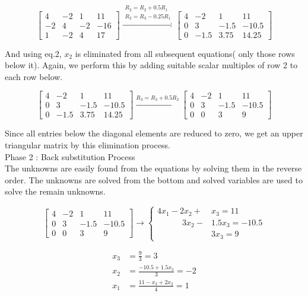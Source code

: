	\[ \begin{bmatrix} 4 & -2 & 1 & 11 \\ -2 & 4 & -2 & -16 \\ 1 & -2 & 4 & 17 \end{bmatrix} \xrightarrow{\substack{R_2 = R_2 + 0.5R_1\\ R_3 = R_3 - 0.25R_1}} \begin{bmatrix} 4 & -2 & 1 & 11 \\ 0 & 3 & -1.5 & -10.5 \\ 0 & -1.5 & 3.75 & 14.25 \end{bmatrix}\]

	And using eq.2, $x_2$ is eliminated from all subsequent equations( only those rows below it). Again, we perform this by adding suitable scalar multiples of row 2 to each row below.

	\[ \begin{bmatrix} 4 & -2 & 1 & 11 \\ 0 & 3 & -1.5 & -10.5 \\ 0 & -1.5 & 3.75 & 14.25 \end{bmatrix} \xrightarrow{R_3 = R_3 + 0.5R_2} \begin{bmatrix} 4 & -2 & 1 & 11 \\ 0 & 3 & -1.5 & -10.5 \\ 0 & 0 & 3 & 9 \end{bmatrix} \]

	Since all entries below the diagonal elements are reduced to zero, we get an upper triangular matrix by this elimination process.\\

	Phase 2 : Back substitution Process\\

	The unknowns are easily found from the equations by solving them in the reverse order. The unknowns are solved from the bottom and solved variables are used to solve the remain unknowns.

	\[ \begin{bmatrix} 4 & -2 & 1 & 11 \\ 0 & 3 & -1.5 & -10.5 \\ 0 & 0 & 3 & 9 \end{bmatrix} \to \begin{cases} 4x_1 - 2x_2 + &x_3  = 11 \\ \quad \qquad 3x_2 - &1.5x_3  = -10.5 \\  &3x_3 = 9 \end{cases}  \]

	\begin{align*} x_3 & = \frac{9}{3} = 3 \\  x_2 & = \frac{-10.5 + 1.5x_3}{3} = -2 \\ x_1 & = \frac{11-x_3+2x_2}{4}=1 \end{align*}

